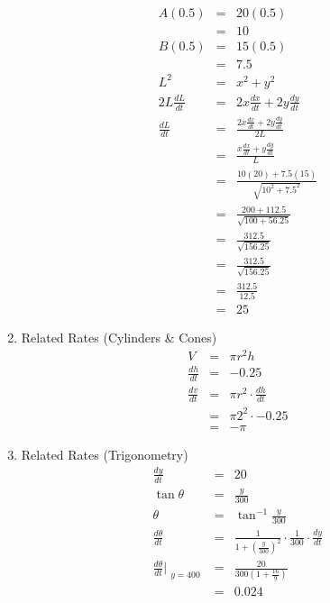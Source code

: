 \documentclass{article}
\begin{document}
\begin{enumerate}
\begin{eqnarray}
        A(0.5) &=& 20(0.5) \\
               &=& 10 \\
        B(0.5) &=& 15(0.5) \\
               &=& 7.5 \\
        L^2 &=& x^2 + y^2 \\
        2L\frac{dL}{dt} &=& 2x\frac{dx}{dt} + 2y\frac{dy}{dt} \\
        \frac{dL}{dt} &=& \frac{2x\frac{dx}{dt} + 2y\frac{dy}{dt}}{2L} \\
                      &=& \frac{x\frac{dx}{dt} + y\frac{dy}{dt}}{L} \\
                      &=& \frac{10(20) + 7.5(15)}{\sqrt{10^2 + 7.5^2}} \\
                      &=& \frac{200 + 112.5}{\sqrt{100 + 56.25}} \\
                      &=& \frac{312.5}{\sqrt{156.25}} \\
                      &=& \frac{312.5}{\sqrt{156.25}} \\
                      &=& \frac{312.5}{12.5} \\
                      &=& 25
    \end{eqnarray}
    \item Related Rates (Cylinders \& Cones)
    \begin{eqnarray}
        V &=& \pi r^2h \\
        \frac{dh}{dt} &=& -0.25 \\
        \frac{dv}{dt} &=& \pi r^2 \cdot \frac{dh}{dt} \\
                      &=& \pi 2^2 \cdot -0.25 \\
                      &=& -\pi
    \end{eqnarray}
    \item Related Rates (Trigonometry)
    \begin{eqnarray}
        \frac{dy}{dt} &=& 20 \\
        \tan{\theta} &=& \frac{y}{300} \\
        \theta &=& \tan^{-1}{\frac{y}{300}} \\
        \frac{d\theta}{dt} &=& \frac{1}{1 + \left(\frac{y}{300}\right)^2} \cdot \frac{1}{300} \cdot \frac{dy}{dt} \\
        \frac{d\theta}{dt}\Bigr|_{\substack{y = 400}} &=& \frac{20}{300\left(1 + \frac{16}{9}\right)} \\
                                                      &=& 0.024
    \end{eqnarray}
\end{enumerate}
\end{document}
